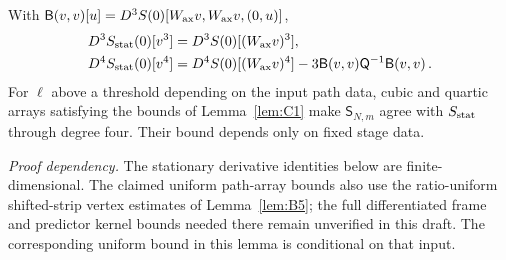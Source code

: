 \begin{lemma}\label{lem:C4}
With $\mathsf B(v,v)[u]=D^3S(0)[W_{\rm ax}v,W_{\rm ax}v,(0,u)]$,
\begin{align*}
D^3S_{\rm stat}(0)[v^3]&=D^3S(0)[(W_{\rm ax}v)^3],\\
D^4S_{\rm stat}(0)[v^4]&=D^4S(0)[(W_{\rm ax}v)^4]-3\mathsf B(v,v)\mathsf Q^{-1}\mathsf B(v,v)\,.
\end{align*}
For $\ell$ above a threshold depending on the input path data, cubic and quartic arrays satisfying the bounds of Lemma~\ref{lem:C1} make $\mathsf S_{N,m}$ agree with $S_{\rm stat}$ through degree four. Their bound depends only on fixed stage data.
\end{lemma}

\noindent\emph{Proof dependency.} The stationary derivative identities below are finite-dimensional. The claimed uniform path-array bounds also use the ratio-uniform shifted-strip vertex estimates of Lemma~\ref{lem:B5}; the full differentiated frame and predictor kernel bounds needed there remain unverified in this draft. The corresponding uniform bound in this lemma is conditional on that input.

